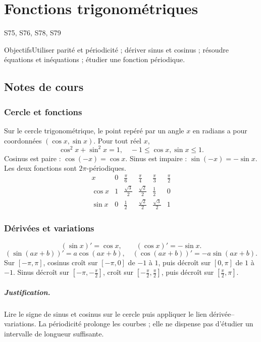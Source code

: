 \setcounter{chapter}{4}\chapter{Fonctions trigonométriques}\label{ch:5}

{\small\sffamily\color{teal}S75, S76, S78, S79\par}

\begin{retenir}{Objectifs}Utiliser parité et périodicité ; dériver sinus et cosinus ; résoudre équations et inéquations ; étudier une fonction périodique.\end{retenir}

\section{Notes de cours}
\subsection{Cercle et fonctions}
Sur le cercle trigonométrique, le point repéré par un angle $x$ en radians a pour coordonnées $(\cos x,\sin x)$. Pour tout réel $x$,
\[\cos^2x+\sin^2x=1,\quad -1\le\cos x,\sin x\le1.\]
Cosinus est paire : $\cos(-x)=\cos x$. Sinus est impaire : $\sin(-x)=-\sin x$. Les deux fonctions sont $2\pi$-périodiques.
\[\begin{array}{c|ccccc}x&0&\frac{\pi}{6}&\frac{\pi}{4}&\frac{\pi}{3}&\frac{\pi}{2}\\\hline
\cos x&1&\frac{\sqrt{3}}{2}&\frac{\sqrt{2}}{2}&\frac{1}{2}&0\\
\sin x&0&\frac{1}{2}&\frac{\sqrt{2}}{2}&\frac{\sqrt{3}}{2}&1
\end{array}\]
\subsection{Dérivées et variations}
\[(\sin x)'=\cos x,\qquad(\cos x)'=-\sin x.\]\[
(\sin(ax+b))'=a\cos(ax+b),\quad(\cos(ax+b))'=-a\sin(ax+b).\]
Sur $[-\pi,\pi]$, cosinus croît sur $[-\pi,0]$ de $-1$ à $1$, puis décroît sur $[0,\pi]$ de $1$ à $-1$. Sinus décroît sur $[-\pi,-\frac{\pi}{2}]$, croît sur $[-\frac{\pi}{2},\frac{\pi}{2}]$, puis décroît sur $[\frac{\pi}{2},\pi]$.
\paragraph{Justification.} Lire le signe de sinus et cosinus sur le cercle puis appliquer le lien dérivée--variations. La périodicité prolonge les courbes ; elle ne dispense pas d'étudier un intervalle de longueur suffisante.
